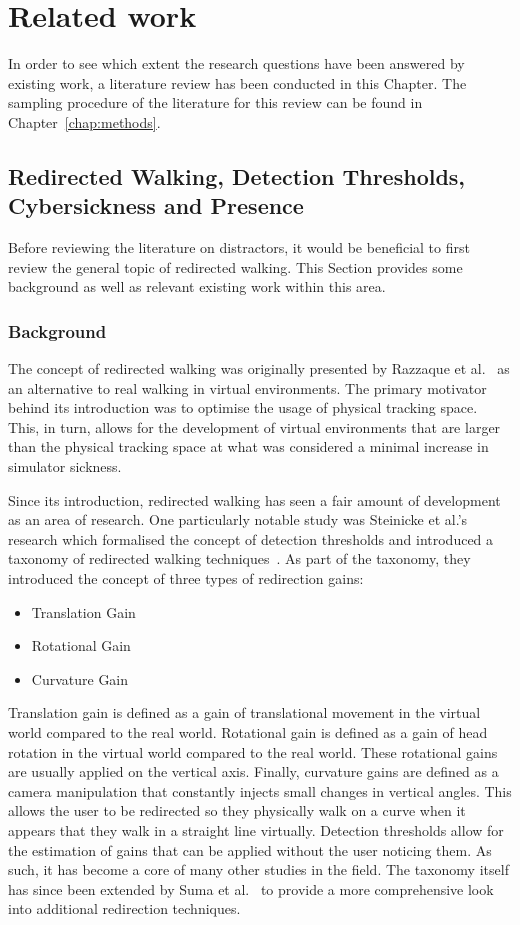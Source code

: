 \chapter{Related work}
In order to see which extent the research questions have been answered by existing work, a literature review has been conducted in this Chapter. The sampling procedure of the literature for this review can be found in Chapter~\ref{chap:methods}. 

\section{Redirected Walking, Detection Thresholds, Cybersickness and Presence}
Before reviewing the literature on distractors, it would be beneficial to first review the general topic of redirected walking. This Section provides some background as well as relevant existing work within this area.

\subsection{Background}
The concept of redirected walking was originally presented by Razzaque et al.~\cite{razzaque2001redirected} as an alternative to real walking in virtual environments. The primary motivator behind its introduction was to optimise the usage of physical tracking space. This, in turn, allows for the development of virtual environments that are larger than the physical tracking space at what was considered a minimal increase in simulator sickness. 

Since its introduction, redirected walking has seen a fair amount of development as an area of research. One particularly notable study was Steinicke et al.'s research which formalised the concept of detection thresholds and introduced a taxonomy of redirected walking techniques~\cite{5072212}. As part of the taxonomy, they introduced the concept of three types of redirection gains:
\begin{itemize}
    \item Translation Gain
    \item Rotational Gain
    \item Curvature Gain
\end{itemize}

Translation gain is defined as a gain of translational movement in the virtual world compared to the real world. Rotational gain is defined as a gain of head rotation in the virtual world compared to the real world. These rotational gains are usually applied on the vertical axis. Finally, curvature gains are defined as a camera manipulation that constantly injects small changes in vertical angles. This allows the user to be redirected so they physically walk on a curve when it appears that they walk in a straight line virtually. Detection thresholds allow for the estimation of gains that can be applied without the user noticing them. As such, it has become a core of many other studies in the field. The taxonomy itself has since been extended by Suma et al.~\cite{suma2012taxonomy} to provide a more comprehensive look into additional redirection techniques. 


